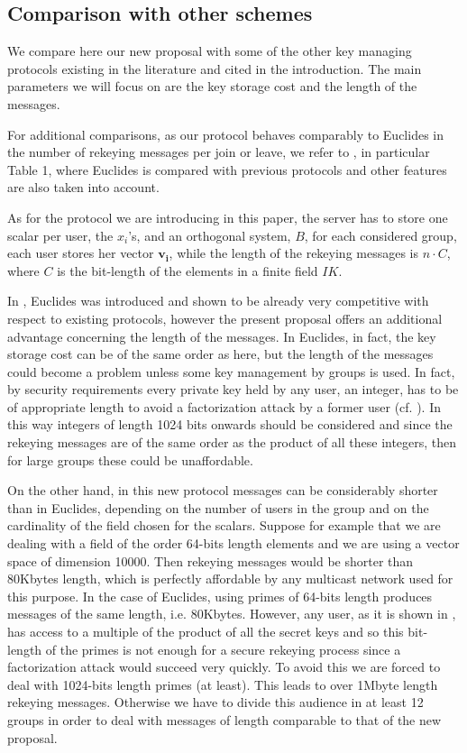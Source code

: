 \documentclass[a4paper,11pt]{amsart}
\theoremstyle{definition}
\begin{document}
\subsection{Comparison with other schemes}

We compare here our new proposal with some of the other key managing
protocols existing in the literature and cited in the introduction.
The main parameters we will focus on are the key storage cost and the
length of the messages.

For additional comparisons, as our protocol behaves comparably to
Euclides in the number of rekeying messages per join or leave, we
refer to \cite{euclid}, in particular Table 1, where Euclides is
compared with previous protocols and other features are also taken
into account.

As for the protocol we are introducing in this paper,
the server has to store one scalar per user, the $x_i$'s, and an
orthogonal system, $B$, for each considered group, each user stores
her vector $\mathbf{v_i} $, while the length of the rekeying messages
is $n\cdot C$, where $C$ is  the bit-length of the elements in a
finite field $I\! \! K$. 

In \cite{euclid}, Euclides was introduced and shown to be already very
competitive with respect to existing protocols, however the present
proposal offers an additional advantage concerning the length of the
messages. In Euclides, in fact, the key storage cost can be of the
same order as here, but the length of the messages could become a
problem unless some key management by groups is used. In fact, by
security requirements every private key held by any user, an integer,
has to be of appropriate length to avoid a factorization attack by a
former user (cf. \cite{euclid}). In this way integers of length 1024
bits onwards should be considered and since the rekeying messages are
of the same order as the product of all these integers, then for large
groups these could be unaffordable.

On the other hand, in this new protocol messages can be considerably
shorter than in Euclides, depending on the number of users in the
group and on the cardinality of the field chosen for the scalars. 
Suppose for example that we are dealing with a field of the order 64-bits
length elements and we are using a vector space of dimension 10000.
Then rekeying messages would be shorter than 80Kbytes length, which is
perfectly affordable by any multicast network used for this purpose.
In the case of Euclides, using primes of 64-bits length produces
messages of the same length, i.e. 80Kbytes.
However, any user, as it is shown in \cite{euclid}, has access to a multiple of
the product of all the secret keys and so this bit-length of the
primes is not enough for a secure rekeying process since a
factorization attack would succeed very quickly. To avoid this we are
forced to deal with 1024-bits length primes (at least).  This leads to
over 1Mbyte length rekeying messages. Otherwise we have to divide this
audience in at least 12 groups in order to deal with messages of
length comparable to that of the new proposal.
\end{document}
